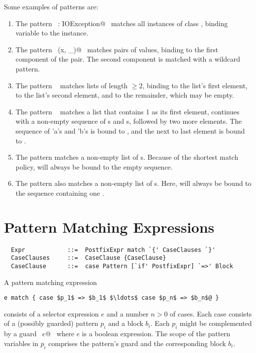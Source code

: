 {\example Some examples of patterns are:
\begin{enumerate}
\item
The pattern ~\lstinline@ex: IOException@~ matches all instances of class
, binding variable  to the instance.
\item
The pattern ~\lstinline@Pair(x, _)@~ matches pairs of values, binding  to
the first component of the pair. The second component is matched
with a wildcard pattern.
\item
The pattern \  matches lists of length $\geq 2$,
binding  to the list's first element,  to the list's
second element, and  to the remainder, which may be empty.
\item
The pattern \  matches a list that
contains 1 as its first element, continues with a non-empty sequence of 
s and s, followed by two more elements. The sequence of 'a's and 'b's
is bound to , and the next to last element is bound to .
\item
The pattern  matches a non-empty list of
s. Because of the shortest match policy,  will always be bound to
the empty sequence.
\item
The pattern  also matches a non-empty list of
s. Here,  will always be bound to
the sequence containing one .
\end{enumerate}

}

\section{Pattern Matching Expressions}
\label{sec:pattern-match}

\syntax\begin{lstlisting}
  Expr            ::=  PostfixExpr match `{' CaseClauses `}'
  CaseClauses     ::=  CaseClause {CaseClause} 
  CaseClause      ::=  case Pattern [`if' PostfixExpr] `=>' Block 
\end{lstlisting}

A pattern matching expression 
\begin{lstlisting}
e match { case $p_1$ => $b_1$ $\ldots$ case $p_n$ => $b_n$@ }
\end{lstlisting}
consists of a selector expression $e$ and a number $n > 0$ of
cases. Each case consists of a (possibly guarded) pattern $p_i$ and a
block $b_i$. Each $p_i$ might be complemented by a guard
~\lstinline@if $e$@~ where $e$ is a boolean expression. 
The scope of the pattern
variables in $p_i$ comprises the pattern's guard and the corresponding block $b_i$.

